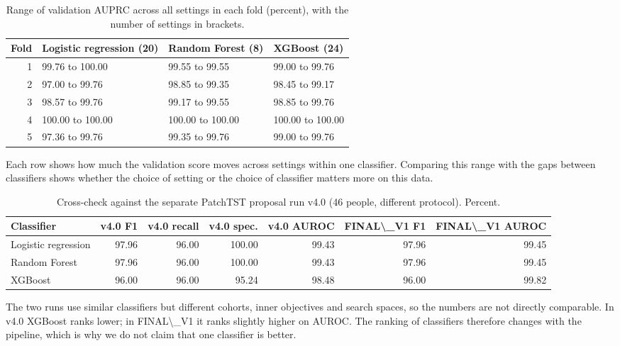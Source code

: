 \documentclass[11pt,a4paper]{article}
\begin{document}
\begin{table}[H]\centering\footnotesize\renewcommand{\arraystretch}{1.15}
\caption{Range of validation AUPRC across all settings in each fold (percent), with the number of settings in brackets.}
\begin{tabular}{rlll}
\toprule
\textbf{Fold} & \textbf{Logistic regression (20)} & \textbf{Random Forest (8)} & \textbf{XGBoost (24)}\\
\midrule
1 & 99.76 to 100.00 & 99.55 to 99.55 & 99.00 to 99.76\\
2 & 97.00 to 99.76 & 98.85 to 99.35 & 98.45 to 99.17\\
3 & 98.57 to 99.76 & 99.17 to 99.55 & 98.85 to 99.76\\
4 & 100.00 to 100.00 & 100.00 to 100.00 & 100.00 to 100.00\\
5 & 97.36 to 99.76 & 99.35 to 99.76 & 99.00 to 99.76\\
\bottomrule
\end{tabular}\end{table}
Each row shows how much the validation score moves across settings within one classifier. Comparing this range with the gaps between classifiers shows whether the choice of setting or the choice of classifier matters more on this data.

\begin{table}[H]\centering\footnotesize\renewcommand{\arraystretch}{1.15}
\caption{Cross-check against the separate PatchTST proposal run v4.0 (46 people, different protocol). Percent.}
\begin{tabular}{lrrrrrr}
\toprule
\textbf{Classifier} & \textbf{v4.0 F1} & \textbf{v4.0 recall} & \textbf{v4.0 spec.} & \textbf{v4.0 AUROC} & \textbf{FINAL\textbackslash{}\_V1 F1} & \textbf{FINAL\textbackslash{}\_V1 AUROC}\\
\midrule
Logistic regression & 97.96 & 96.00 & 100.00 & 99.43 & 97.96 & 99.45\\
Random Forest & 97.96 & 96.00 & 100.00 & 99.43 & 97.96 & 99.45\\
XGBoost & 96.00 & 96.00 & 95.24 & 98.48 & 96.00 & 99.82\\
\bottomrule
\end{tabular}\end{table}
The two runs use similar classifiers but different cohorts, inner objectives and search spaces, so the numbers are not directly comparable. In v4.0 XGBoost ranks lower; in FINAL\textbackslash{}\_V1 it ranks slightly higher on AUROC. The ranking of classifiers therefore changes with the pipeline, which is why we do not claim that one classifier is better.
\end{document}
